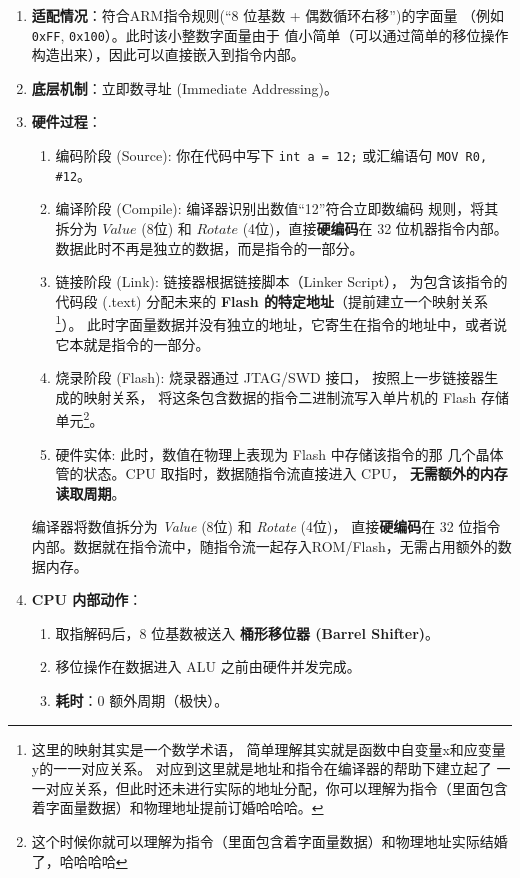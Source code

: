 \begin{enumerate}[label=(\arabic*), wide=0pt]
    \item \textbf{适配情况}：符合ARM指令规则(“8 位基数 + 偶数循环右移”)的字面量
    （例如 \texttt{0xFF}, \texttt{0x100}）。此时该小整数字面量由于
    值小简单（可以通过简单的移位操作构造出来），因此可以直接嵌入到指令内部。

    \item \textbf{底层机制}：立即数寻址 (Immediate Addressing)。
    \item \textbf{硬件过程}：
    
    
    \begin{enumerate}[label=\ding{\numexpr171+\arabic*}]
        \item 编码阶段 (Source): 你在代码中写下 \texttt{int a = 12;} 或汇编语句 \texttt{MOV R0, \#12}。
        
        \item 编译阶段 (Compile): 编译器识别出数值“12”符合立即数编码
        规则，将其拆分为 $Value$ (8位) 和 $Rotate$ (4位)，直接\textbf{硬编码}在 
        32 位机器指令内部。数据此时不再是独立的数据，而是指令的一部分。
        
        \item 链接阶段 (Link): 链接器根据链接脚本（Linker Script），
        为包含该指令的代码段 (.text) 分配未来的 \textbf{Flash 的特定地址}（提前建立一个映射关系\footnote{这里的映射其实是一个数学术语，
        简单理解其实就是函数中自变量x和应变量y的一一对应关系。
        对应到这里就是地址和指令在编译器的帮助下建立起了
        一一对应关系，但此时还未进行实际的地址分配，你可以理解为指令（里面包含着字面量数据）和物理地址提前订婚哈哈哈。}）。
        此时字面量数据并没有独立的地址，它寄生在指令的地址中，或者说它本就是指令的一部分。
        
        \item 烧录阶段 (Flash): 烧录器通过 JTAG/SWD 接口，
    按照上一步链接器生成的映射关系，
        将这条包含数据的指令二进制流写入单片机的 Flash 存储单元\footnote{
            这个时候你就可以理解为指令（里面包含着字面量数据）和物理地址实际结婚了，哈哈哈哈}。
        
        \item 硬件实体: 此时，数值在物理上表现为 Flash 中存储该指令的那
            几个晶体管的状态。CPU 取指时，数据随指令流直接进入 CPU，
        \textbf{无需额外的内存读取周期}。
    \end{enumerate}   
    
    
    编译器将数值拆分为 \textit{Value} (8位) 和 \textit{Rotate} (4位)，
    直接\textbf{硬编码}在 32 位指令内部。数据就在指令流中，随指令流一起存入ROM/Flash，无需占用额外的数据内存。
    \item \textbf{CPU 内部动作}：
    \begin{enumerate}[label=\ding{\numexpr171+\arabic*}]
        \item 取指解码后，8 位基数被送入 \textbf{桶形移位器 (Barrel Shifter)}。
        \item 移位操作在数据进入 ALU 之前由硬件并发完成。
        \item \textbf{耗时}：0 额外周期（极快）。
    \end{enumerate}
\end{enumerate}



